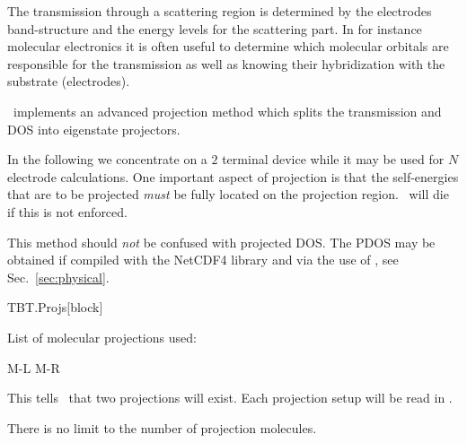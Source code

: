 The transmission through a scattering region is determined by the
electrodes band-structure and the energy levels for the scattering
part. In for instance molecular electronics it is often useful to
determine which molecular orbitals are responsible for the
transmission as well as knowing their hybridization with the substrate
(electrodes). 

\tbtrans\ implements an advanced projection method which splits the
transmission and DOS into eigenstate projectors.

In the following we concentrate on a $2$ terminal device while it may
be used for $N$ electrode calculations. 
%
One important aspect of projection is that the self-energies that are
to be projected \emph{must} be fully located on the projection
region. \tbtrans\ will die if this is not enforced.

This method should \emph{not} be confused with projected DOS. The PDOS
may be obtained if compiled with the NetCDF4 library and via the use
of \sisl, see Sec.~\ref{sec:physical}.

\begin{fdfentry}{TBT.Projs}[block]

  List of molecular projections used:
\begin{fdfexample}
    M-L
    M-R
\end{fdfexample}

  This tells \tbtrans\ that two projections will exist. Each
  projection setup will be read in .

  There is no limit to the number of projection molecules.
  
\end{fdfentry}

